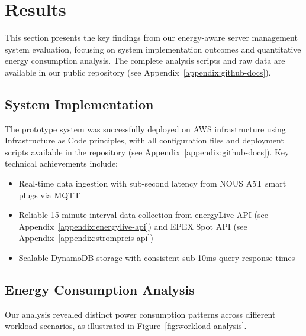 

\section{Results}
\label{results:results}
This section presents the key findings from our energy-aware server management system evaluation, focusing on system implementation outcomes and quantitative energy consumption analysis. The complete analysis scripts and raw data are available in our public repository (see Appendix~\ref{appendix:github-docs}).

\subsection{System Implementation}
\label{results:system-implementation}
The prototype system was successfully deployed on AWS infrastructure using Infrastructure as Code principles, with all configuration files and deployment scripts available in the repository (see Appendix~\ref{appendix:github-docs}). Key technical achievements include:
\begin{itemize}[noitemsep,topsep=0pt]
    \item Real-time data ingestion with sub-second latency from NOUS A5T smart plugs via MQTT
    \item Reliable 15-minute interval data collection from energyLive API (see Appendix~\ref{appendix:energylive-api}) and EPEX Spot API (see Appendix~\ref{appendix:strompreis-api})
    \item Scalable DynamoDB storage with consistent sub-10ms query response times
\end{itemize}

\subsection{Energy Consumption Analysis}
\label{results:energy-analysis}
Our analysis revealed distinct power consumption patterns across different workload scenarios, as illustrated in Figure~\ref{fig:workload-analysis}.

